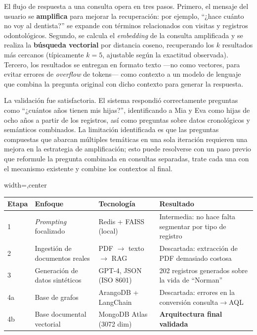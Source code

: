 El flujo de respuesta a una consulta opera en tres pasos. Primero, el mensaje del usuario se \textbf{amplifica} para mejorar la recuperación: por ejemplo, ``¿hace cuánto no voy al dentista?'' se expande con términos relacionados con visitas y registros odontológicos. Segundo, se calcula el \textit{embedding} de la consulta amplificada y se realiza la \textbf{búsqueda vectorial} por distancia coseno, recuperando los $k$ resultados más cercanos (típicamente $k=5$, ajustable según la exactitud observada). Tercero, los resultados se entregan en formato texto —no como vectores, para evitar errores de \textit{overflow} de tokens— como contexto a un modelo de lenguaje que combina la pregunta original con dicho contexto para generar la respuesta.

La validación fue satisfactoria. El sistema respondió correctamente preguntas como ``¿cuántos años tienen mis hijas?'', identificando a Mia y Eva como hijas de ocho años a partir de los registros, así como preguntas sobre datos cronológicos y semánticos combinados. La limitación identificada es que las preguntas compuestas que abarcan múltiples temáticas en una sola iteración requieren una mejora en la estrategia de amplificación; esto puede resolverse con un paso previo que reformule la pregunta combinada en consultas separadas, trate cada una con el mecanismo existente y combine los contextos al final.

\begin{center}
\label{tab:etapas-resumen}
\footnotesize
\begin{adjustbox}{width=\textwidth,center}
\begin{tabular}{llll}
\toprule
\textbf{Etapa} & \textbf{Enfoque} & \textbf{Tecnología} & \textbf{Resultado} \\
\midrule
1 & \textit{Prompting} focalizado & Redis + FAISS (local) & Intermedia: no hace falta segmentar por tipo de registro \\
2 & Ingestión de documentos reales & PDF $\rightarrow$ texto $\rightarrow$ RAG & Descartada: extracción de PDF demasiado costosa \\
3 & Generación de datos sintéticos & GPT-4, JSON (ISO 8601) & 202 registros generados sobre la vida de ``Norman'' \\
4a & Base de grafos & ArangoDB + LangChain & Descartada: errores en la conversión consulta$\rightarrow$AQL \\
4b & Base documental vectorial & MongoDB Atlas (3072 dim) & \textbf{Arquitectura final validada} \\
\bottomrule
\end{tabular}
\end{adjustbox}
\end{center}

